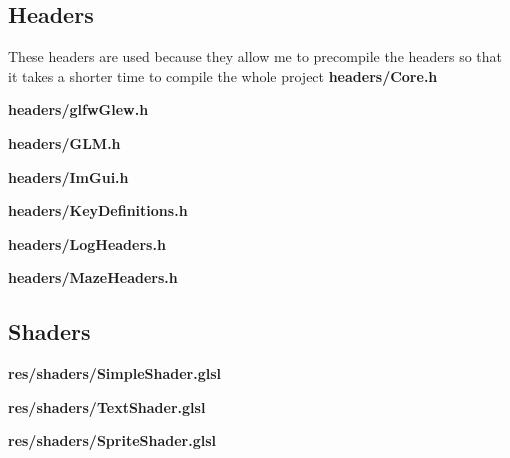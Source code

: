 \documentclass[../Main.tex]{subfiles}
\begin{document}
    \subsection{Headers}
        These headers are used because they allow me to precompile the headers so that it takes a shorter time to compile the whole project
        \textbf{headers/Core.h}
        
        \textbf{headers/glfwGlew.h}
        
        \textbf{headers/GLM.h}
        
        \textbf{headers/ImGui.h}
        
        \textbf{headers/KeyDefinitions.h}
        
        \textbf{headers/LogHeaders.h}
        
        \textbf{headers/MazeHeaders.h}
        

    \subsection{Shaders}
        \textbf{res/shaders/SimpleShader.glsl}
        
        \textbf{res/shaders/TextShader.glsl}
        
        \textbf{res/shaders/SpriteShader.glsl}
        
\end{document}
